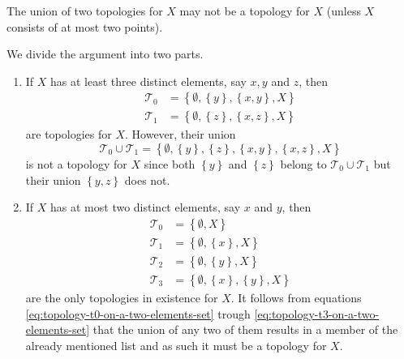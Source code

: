 \begin{problem}
  The union of two topologies for \(X\) may not be a topology for \(X\) (unless
  \(X\) consists of at most two points).
  \label{problem:the-union-of-topologies-may-not-be-a-topology}
\end{problem}

\begin{solution}
  We divide the argument into two parts.
  \begin{enumerate}
    \item
      If \(X\) has at least three distinct elements, say \(x,y\) and \(z\), then
      \begin{align}
        \label{eq:topology-t0-for-a-set-with-at-least-three-elements}
        \mathcal{T}_{0}&=\left\{\emptyset,\left\{y\right\},\left\{x,y\right\},X\right\}\\
        \label{eq:topology-t1-for-a-set-with-at-least-three-elements}
        \mathcal{T}_{1}&=\left\{\emptyset,\left\{z\right\},\left\{x,z\right\},X\right\}
      \end{align}
      are topologies for \(X\). However, their union
      \begin{equation}
        \mathcal{T}_{0}\cup\mathcal{T}_{1}=\left\{\emptyset,\left\{y\right\},\left\{z\right\},\left\{x,y\right\},\left\{x,z\right\},X\right\}
      \end{equation}
      is not a topology for \(X\) since both \(\left\{y\right\}\) and
      \(\left\{z\right\}\) belong to \(\mathcal{T}_{0}\cup\mathcal{T}_{1}\) but
      their union \(\left\{y,z\right\}\) does not.
    \item
      If \(X\) has at most two distinct elements, say \(x\) and \(y\),
      then
      \begin{align}
        \label{eq:topology-t0-on-a-two-elements-set}
        \mathcal{T}_{0}&=\left\{\emptyset,X\right\}\\
        \label{eq:topology-t1-on-a-two-elements-set}
        \mathcal{T}_{1}&=\left\{\emptyset,\left\{x\right\},X\right\}\\
        \label{eq:topology-t2-on-a-two-elements-set}
        \mathcal{T}_{2}&=\left\{\emptyset,\left\{y\right\},X\right\}\\
        \label{eq:topology-t3-on-a-two-elements-set}
        \mathcal{T}_{3}&=\left\{\emptyset,\left\{x\right\},\left\{y\right\},X\right\}
      \end{align}
      are the only topologies in existence for \(X\). It follows from equations
      \eqref{eq:topology-t0-on-a-two-elements-set} trough
      \eqref{eq:topology-t3-on-a-two-elements-set} that the union of any two of
      them results in a member of the already mentioned list and as such it
      must be a topology for \(X\).
  \end{enumerate}
\end{solution}

